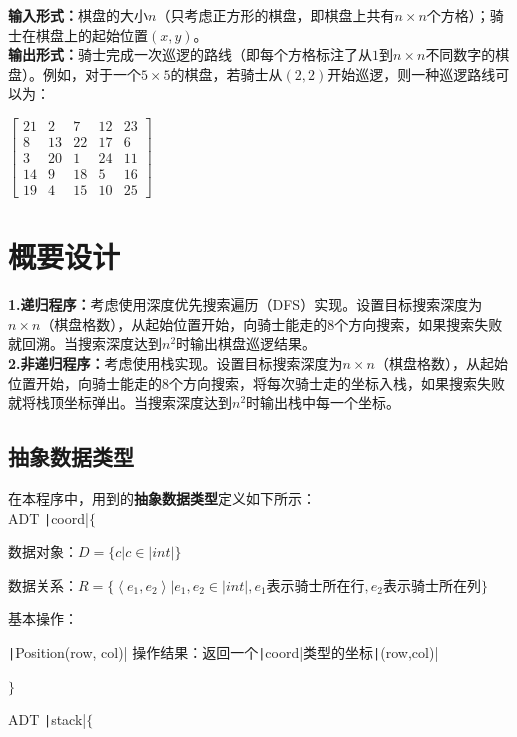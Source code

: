 \documentclass[10pt,a4paper]{article}
\begin{document}
	\noindent \textbf{输入形式：}棋盘的大小$n$（只考虑正方形的棋盘，即棋盘上共有$n\times n$个方格）；骑士在棋盘上的起始位置$(x, y)$。\\
	
	\noindent \textbf{输出形式：}骑士完成一次巡逻的路线（即每个方格标注了从$1$到$n\times n$不同数字的棋盘）。例如，对于一个$5\times 5$的棋盘，若骑士从$(2,2)$开始巡逻，则一种巡逻路线可以为：\\
	\begin{center}
		$\begin{bmatrix}
		21&2&7&12&23\\
		8&13&22&17&6\\
		3&20&1&24&11\\
		14&9&18&5&16\\
		19&4&15&10&25
		\end{bmatrix}$
	\end{center}
	\newpage
	\section{概要设计}
	\noindent \textbf{1.递归程序：}考虑使用深度优先搜索遍历（DFS）实现。设置目标搜索深度为$n\times n$（棋盘格数），从起始位置开始，向骑士能走的8个方向搜索，如果搜索失败就回溯。当搜索深度达到$n^2$时输出棋盘巡逻结果。\\

	\noindent \textbf{2.非递归程序：}考虑使用栈实现。设置目标搜索深度为$n\times n$（棋盘格数），从起始位置开始，向骑士能走的8个方向搜索，将每次骑士走的坐标入栈，如果搜索失败就将栈顶坐标弹出。当搜索深度达到$n^2$时输出栈中每一个坐标。
	\subsection{抽象数据类型} 
	\noindent 在本程序中，用到的\textbf{抽象数据类型}定义如下所示：\\
	
	\noindent ADT \texttt|coord|$\{$
	
	数据对象：$D=\{c | c\in \texttt|int|\}$
	
	数据关系：$R=\{ \left\langle e_1,e_2\right\rangle | e_1,e_2 \in \texttt|int|,e_1\text{表示骑士所在行},e_2\text{表示骑士所在列}\}$
	
	基本操作：
	
	\qquad \texttt|Position(row, col)| 操作结果：返回一个\texttt|coord|类型的坐标\texttt|(row,col)|
	
	\noindent $\}$
	
	\noindent ADT \texttt|stack|$\{$
	
\end{document}
